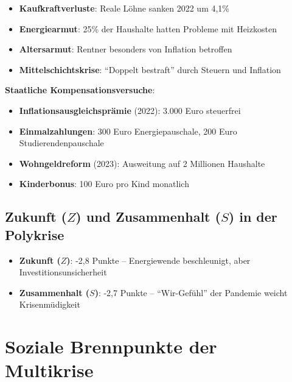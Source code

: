 \begin{itemize}
    \item \textbf{Kaufkraftverluste}: Reale Löhne sanken 2022 um 4,1\%
    \item \textbf{Energiearmut}: 25\% der Haushalte hatten Probleme mit Heizkosten
    \item \textbf{Altersarmut}: Rentner besonders von Inflation betroffen
    \item \textbf{Mittelschichtskrise}: \enquote{Doppelt bestraft} durch Steuern und Inflation
\end{itemize}

\textbf{Staatliche Kompensationsversuche}:
\begin{itemize}
    \item \textbf{Inflationsausgleichsprämie} (2022): 3.000 Euro steuerfrei
    \item \textbf{Einmalzahlungen}: 300 Euro Energiepauschale, 200 Euro Studierendenpauschale
    \item \textbf{Wohngeldreform} (2023): Ausweitung auf 2 Millionen Haushalte
    \item \textbf{Kinderbonus}: 100 Euro pro Kind monatlich
\end{itemize}

\subsection{Zukunft (\(Z\)) und Zusammenhalt (\(S\)) in der Polykrise}

\begin{itemize}
    \item \textbf{Zukunft (\(Z\))}: -2,8 Punkte – Energiewende beschleunigt, aber Investitionsunsicherheit
    \item \textbf{Zusammenhalt (\(S\))}: -2,7 Punkte – \enquote{Wir-Gefühl} der Pandemie weicht Krisenmüdigkeit
\end{itemize}

\section{Soziale Brennpunkte der Multikrise}

